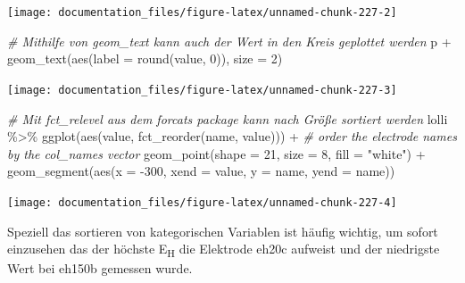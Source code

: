 \documentclass[
]{article}
\newenvironment{Shaded}{\begin{snugshade}}{\end{snugshade}}
\newcommand{\AttributeTok}[1]{\textcolor[rgb]{0.77,0.63,0.00}{#1}}
\newcommand{\CommentTok}[1]{\textcolor[rgb]{0.56,0.35,0.01}{\textit{#1}}}
\newcommand{\DecValTok}[1]{\textcolor[rgb]{0.00,0.00,0.81}{#1}}
\newcommand{\FunctionTok}[1]{\textcolor[rgb]{0.00,0.00,0.00}{#1}}
\newcommand{\NormalTok}[1]{#1}
\newcommand{\SpecialCharTok}[1]{\textcolor[rgb]{0.00,0.00,0.00}{#1}}
\newcommand{\StringTok}[1]{\textcolor[rgb]{0.31,0.60,0.02}{#1}}
\begin{document}
\begin{center}\texttt{[image: documentation\_files/figure-latex/unnamed-chunk-227-2]} \end{center}

\begin{Shaded}
\begin{Highlighting}[]
\CommentTok{\# Mithilfe von geom\_text kann auch der Wert in den Kreis geplottet werden}
\NormalTok{p }\SpecialCharTok{+} \FunctionTok{geom\_text}\NormalTok{(}\FunctionTok{aes}\NormalTok{(}\AttributeTok{label =} \FunctionTok{round}\NormalTok{(value, }\DecValTok{0}\NormalTok{)), }\AttributeTok{size =} \DecValTok{2}\NormalTok{)}
\end{Highlighting}
\end{Shaded}

\begin{center}\texttt{[image: documentation\_files/figure-latex/unnamed-chunk-227-3]} \end{center}

\begin{Shaded}
\begin{Highlighting}[]
\CommentTok{\# Mit fct\_relevel aus dem forcats package kann nach Größe sortiert werden}
\NormalTok{lolli }\SpecialCharTok{\%\textgreater{}\%}
  \FunctionTok{ggplot}\NormalTok{(}\FunctionTok{aes}\NormalTok{(value, }\FunctionTok{fct\_reorder}\NormalTok{(name, value))) }\SpecialCharTok{+} \CommentTok{\# order the electrode names by the col\_names vector}
  \FunctionTok{geom\_point}\NormalTok{(}\AttributeTok{shape =} \DecValTok{21}\NormalTok{, }\AttributeTok{size =} \DecValTok{8}\NormalTok{, }\AttributeTok{fill =} \StringTok{"white"}\NormalTok{) }\SpecialCharTok{+}
  \FunctionTok{geom\_segment}\NormalTok{(}\FunctionTok{aes}\NormalTok{(}\AttributeTok{x =} \SpecialCharTok{{-}}\DecValTok{300}\NormalTok{, }\AttributeTok{xend =}\NormalTok{ value, }\AttributeTok{y =}\NormalTok{ name, }\AttributeTok{yend =}\NormalTok{ name))}
\end{Highlighting}
\end{Shaded}

\begin{center}\texttt{[image: documentation\_files/figure-latex/unnamed-chunk-227-4]} \end{center}

Speziell das sortieren von kategorischen Variablen ist häufig wichtig, um sofort einzusehen das der höchste E\textsubscript{H} die Elektrode eh20c aufweist und der niedrigste Wert bei eh150b gemessen wurde.
\end{document}
